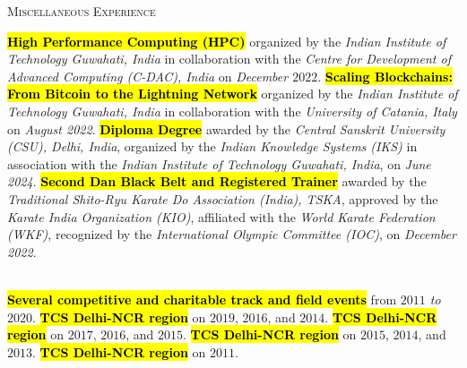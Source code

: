 \begin{rubric}{\textsc{Miscellaneous Experience}}


%
 \hl{\textbf{High Performance Computing (HPC)}} organized by the \emph{Indian Institute of Technology Guwahati, India} in collaboration with the \emph{Centre for Development of Advanced Computing (C-DAC), India} on \emph{December $2022$}.
%
 \hl{\textbf{Scaling Blockchains: From Bitcoin to the Lightning Network}} organized by the \emph{Indian Institute of Technology Guwahati, India} in collaboration with the \emph{University of Catania, Italy} on \emph{August 2022}.
%
 \hl{\textbf{Diploma Degree}} awarded by the \emph{Central Sanskrit University (CSU), Delhi, India}, organized by the \emph{Indian Knowledge Systems (IKS)} in association with the \emph{Indian Institute of Technology Guwahati, India}, on \emph{June 2024}.
%
 \hl{\textbf{Second Dan Black Belt and Registered Trainer}} awarded by the \emph{Traditional Shito-Ryu Karate Do Association (India), TSKA}, approved by the \emph{Karate India Organization (KIO)}, affiliated with the \emph{World Karate Federation (WKF)}, recognized by the \emph{International Olympic Committee (IOC)}, on \emph{December 2022}.
%

\\
%
 \hl{\textbf{Several competitive and charitable track and field events}} from \emph{$2011$ to $2020$}.
%
 \hl{\textbf{TCS Delhi-NCR region}} on $2019$, $2016$, and $2014$.
%
 \hl{\textbf{TCS Delhi-NCR region}} on $2017$, $2016$, and $2015$.
%
 \hl{\textbf{TCS Delhi-NCR region}} on $2015$, $2014$, and $2013$.
%
 \hl{\textbf{TCS Delhi-NCR region}} on $2011$.
%
\end{rubric}